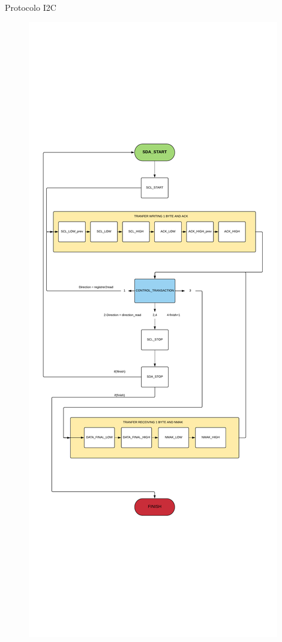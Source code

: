 \documentclass{beamer}
\begin{document}
\begin{frame}{Protocolo I2C}
	\begin{figure}[H]
		\center
		\includegraphics[trim = 0mm 8cm 0mm 10cm, clip,scale=0.23]{imagenes/Cuadricoptero_vision/I2C_WRITE.pdf}
	\end{figure}
\end{frame}
\end{document}
